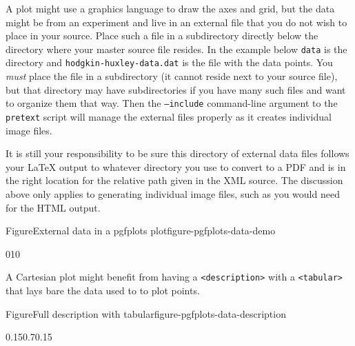 \documentclass{amsart}
\theoremstyle{plain}%
\theoremstyle{definition}%
\theoremstyle{remark}%
\newcommand{\mono}[1]{\texttt{#1}}
\numberwithin{equation}{section}
\begin{document}
A plot might use a graphics language to draw the axes and grid, but the data might be from an experiment and live in an external file that you do not wish to place in your source.  Place such a file in a subdirectory directly below the directory where your master source file resides.  In the example below \mono{data} is the directory and \mono{hodgkin-huxley-data.dat} is the file with the data points.  You \emph{must} place the file in a subdirectory (it cannot reside next to your source file), but that directory may have subdirectories if you have many such files and want to organize them that way.  Then the \mono{--include} command-line argument to the \mono{pretext} script will manage the external files properly as it creates individual image files.%
\par
It is still your responsibility to be sure this directory of external data files follows your \LaTeX{} output to whatever directory you use to convert to a PDF and is in the right location for the relative path given in the XML source.  The discussion above only applies to generating individual image files, such as you would need for the HTML output.%
\begin{figureptx}{Figure}{External data in a pgfplots plot}{figure-pgfplots-data-demo}{}%
\begin{image}{0}{1}{0}{}%
%
\end{image}%
\tcblower
\end{figureptx}%
A Cartesian plot might benefit from having a \mono{<description>} with a \mono{<tabular>} that lays bare the data used to to plot points.%
\begin{figureptx}{Figure}{Full description with tabular}{figure-pgfplots-data-description}{}%
\begin{image}{0.15}{0.7}{0.15}{}%
%
\end{image}%
\tcblower
\end{figureptx}%
\end{document}
